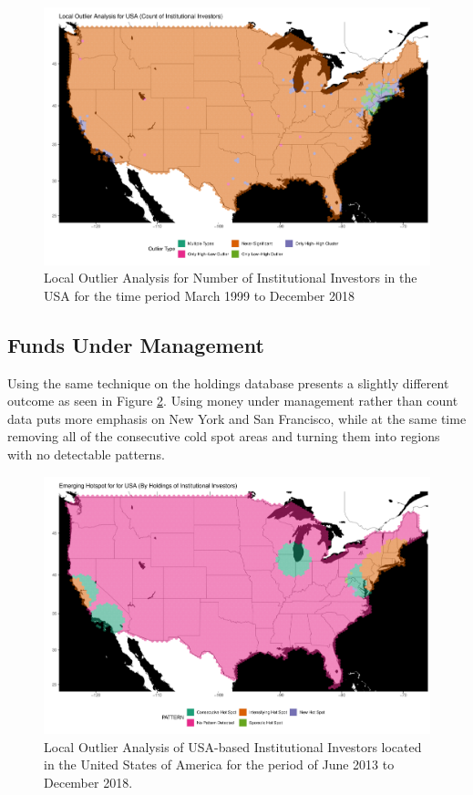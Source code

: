 \begin{figure}
	\centering
	\includegraphics[width=1\linewidth]{Figures/ChapterIV/USA_Count_LO}
	\caption[Local Outlier Analysis for Number of Institutional Investors in the USA 1999-2018]{Local Outlier Analysis for Number of Institutional Investors in the USA for the time period March 1999 to December 2018}
	\label{fig:usaloacount}
\end{figure}

\subsection{Funds Under Management}

Using the same technique on the holdings database presents a slightly different  outcome as seen in Figure \ref{fig:usaHSP_Money}. Using money under management rather than count data puts more emphasis on New York and San Francisco, while at the same time removing all of the consecutive cold spot areas and turning them into regions with no detectable patterns.  	

\begin{figure}
	\centering
	\includegraphics[width=1\linewidth]{Figures/ChapterIV/USA_Money_EH}
	\caption[Local Outlier Analysis of USA-based Institutional Investors 2013-2018]{Local Outlier Analysis of USA-based Institutional Investors located in the United States of America for the period of June 2013 to December 2018. }
	\label{fig:usaHSP_Money}
\end{figure}	


